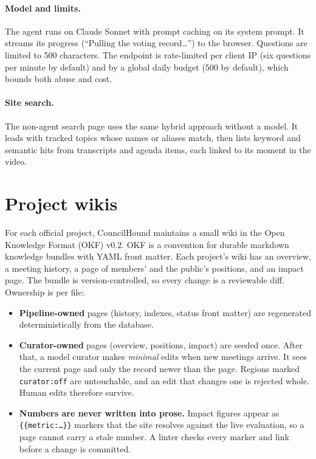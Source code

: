 \documentclass[11pt]{article}
\newcommand{\code}[1]{\texttt{#1}}
\begin{document}
\paragraph{Model and limits.} The agent runs on Claude Sonnet with prompt caching on its
system prompt. It streams its progress (``Pulling the voting record\ldots'') to the
browser. Questions are limited to 500 characters. The endpoint is rate-limited per client
IP (six questions per minute by default) and by a global daily budget (500 by default),
which bounds both abuse and cost.

\paragraph{Site search.} The non-agent search page uses the same hybrid approach without a
model. It leads with tracked topics whose names or aliases match, then lists keyword and
semantic hits from transcripts and agenda items, each linked to its moment in the video.

\section{Project wikis}

For each official project, CouncilHound maintains a small wiki in the Open Knowledge
Format (OKF) v0.2. OKF is a convention for durable markdown knowledge bundles with YAML
front matter. Each project's wiki has an overview, a meeting history, a page of members'
and the public's positions, and an impact page. The bundle is version-controlled, so every
change is a reviewable diff. Ownership is per file:

\begin{itemize}
  \item \textbf{Pipeline-owned} pages (history, indexes, status front matter) are
        regenerated deterministically from the database.
  \item \textbf{Curator-owned} pages (overview, positions, impact) are seeded once. After
        that, a model curator makes \emph{minimal} edits when new meetings arrive. It sees
        the current page and only the record newer than the page. Regions marked
        \code{curator:off} are untouchable, and an edit that changes one is rejected whole.
        Human edits therefore survive.
  \item \textbf{Numbers are never written into prose.} Impact figures appear as
        \code{\{\{metric:\ldots\}\}} markers that the site resolves against the live
        evaluation, so a page cannot carry a stale number. A linter checks every marker
        and link before a change is committed.
\end{itemize}
\end{document}
